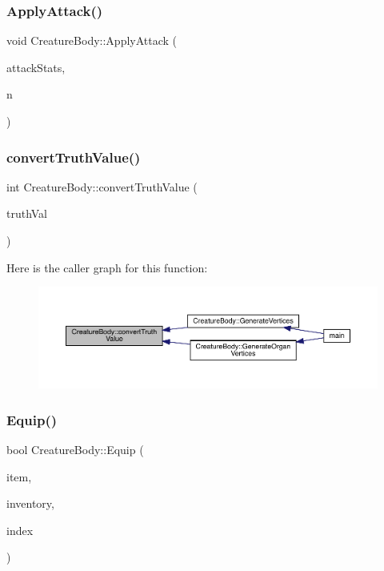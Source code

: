 \subsubsection{\texorpdfstring{Apply\+Attack()}{ApplyAttack()}}
{\footnotesize\ttfamily void Creature\+Body\+::\+Apply\+Attack (\begin{DoxyParamCaption}\item[{\mbox{\hyperlink{struct_attack_stats}{Attack\+Stats}}}]{attack\+Stats,  }\item[{int}]{n }\end{DoxyParamCaption})}

\mbox{\label{class_creature_body_a2e5f101eb4ce889f47810e8e65164d50}} 
\subsubsection{\texorpdfstring{convert\+Truth\+Value()}{convertTruthValue()}}
{\footnotesize\ttfamily int Creature\+Body\+::convert\+Truth\+Value (\begin{DoxyParamCaption}\item[{std\+::string}]{truth\+Val }\end{DoxyParamCaption})}

Here is the caller graph for this function\+:
\nopagebreak
\begin{figure}[H]
\begin{center}
\leavevmode
\includegraphics[width=350pt]{da/d7d/class_creature_body_a2e5f101eb4ce889f47810e8e65164d50_icgraph}
\end{center}
\end{figure}
\mbox{\label{class_creature_body_a8a55f2c0785aaf956cdee04a538dfb97}} 
\subsubsection{\texorpdfstring{Equip()}{Equip()}}
{\footnotesize\ttfamily bool Creature\+Body\+::\+Equip (\begin{DoxyParamCaption}\item[{std\+::unique\+\_\+ptr$<$ \mbox{\hyperlink{class_item}{Item}} $>$}]{item,  }\item[{\mbox{\hyperlink{class_item_manager}{Item\+Manager}} \&}]{inventory,  }\item[{int}]{index }\end{DoxyParamCaption})}

